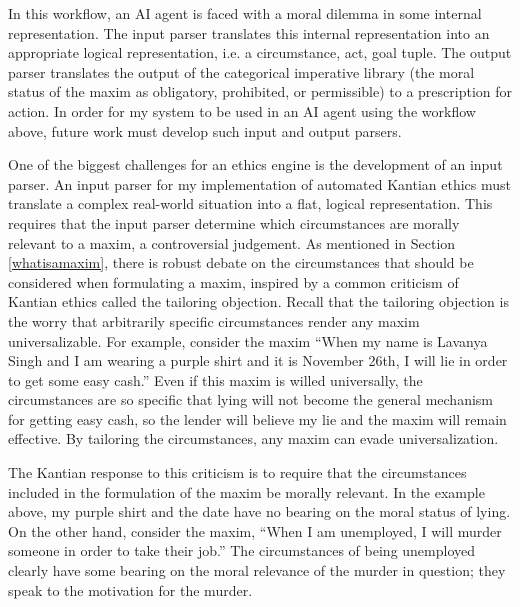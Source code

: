 \begin{isabellebody}
\begin{isamarkuptext}
In this workflow, an AI agent is faced with a moral dilemma in some internal representation. The input
parser translates this internal representation into an appropriate logical representation, i.e. 
a circumstance, act, goal tuple. The output parser translates the output of the categorical imperative
library (the moral status of the maxim as obligatory, prohibited, or permissible) to a prescription for
action. In order for my system to be used in an AI agent using the workflow
above, future work must develop such input and output parsers.

One of the biggest challenges for an ethics engine is the development of an input parser. An input parser 
for my implementation of automated Kantian ethics must translate a complex real-world situation into a flat, logical representation.
This requires that the input parser determine which circumstances are morally relevant
to a maxim, a controversial judgement. As mentioned in Section \ref{whatisamaxim},
there is robust debate on the circumstances that should be considered when formulating a maxim, 
inspired by a common criticism of Kantian ethics called the tailoring objection. Recall that the 
tailoring objection is the worry that arbitrarily specific 
circumstances render any maxim universalizable. For example, consider the maxim ``When my name is Lavanya Singh 
and I am wearing a purple shirt and it is November 26th, I will lie in order to get some easy cash.'' 
Even if this maxim is willed universally, the circumstances are so 
specific that lying will not become the general mechanism for getting easy cash, so the lender will 
believe my lie and the maxim will remain effective. By tailoring the circumstances, any maxim can 
evade universalization.

The Kantian response to this criticism is to require that the circumstances included in the formulation
of the maxim be morally relevant. In the example above, my purple shirt and the date have no bearing on 
the moral status of lying. On the other hand, consider the maxim, ``When I am unemployed, I will murder
someone in order to take their job.'' The circumstances of being unemployed clearly have some bearing on the moral
relevance of the murder in question; they speak to the motivation for the murder. 


\end{isamarkuptext}
\end{isabellebody}
